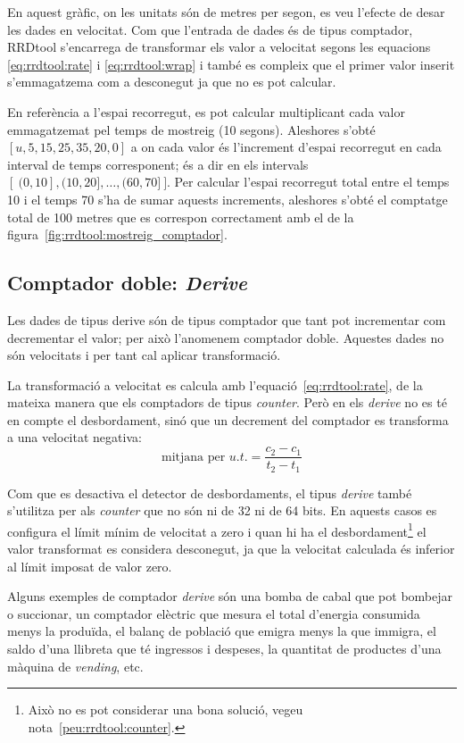 En aquest gràfic, on les unitats són de metres per segon, es veu l'efecte de desar les dades en velocitat. Com que l'entrada de dades és de tipus comptador, RRDtool s'encarrega de transformar els valor a velocitat segons les equacions \ref{eq:rrdtool:rate} i \ref{eq:rrdtool:wrap} i també es compleix que el primer valor inserit s'emmagatzema com a desconegut ja que no es pot calcular. 

En referència a l'espai recorregut, es pot calcular multiplicant cada valor emmagatzemat pel temps de mostreig (10 segons). Aleshores s'obté 
$[u , 5 , 15 , 25 , 35 , 20 , 0]$
a on cada valor és l'increment d'espai recorregut en cada interval de temps corresponent; és a dir en els intervals
$[\ (0,10], (10,20], \ldots, (60,70]\ ]$.
 Per calcular l'espai recorregut total entre el temps 10 i el temps 70 s'ha de sumar aquests increments, aleshores s'obté el comptatge total de 100 metres que es correspon correctament amb el de la figura~\ref{fig:rrdtool:mostreig_comptador}.





\subsection{Comptador doble:  \emph{Derive}}

Les dades de tipus derive són de tipus comptador que tant pot incrementar com decrementar el valor; per això l'anomenem comptador doble. Aquestes dades no són velocitats i per tant cal aplicar transformació. 

La transformació a velocitat es calcula amb l'equació~\ref{eq:rrdtool:rate}, de la mateixa manera que els comptadors de tipus \emph{counter}. Però en els \emph{derive} no es té en compte el desbordament, sinó que un decrement del comptador es transforma a una velocitat negativa:  
$$
\text{mitjana per }u.t. =\frac{c_2-c_1}{t_2-t_1}
$$

Com que es desactiva el detector de desbordaments, el tipus \emph{derive} també s'utilitza per als \emph{counter} que no són ni de 32 ni de 64 bits. En aquests casos es configura el límit mínim de velocitat a zero i quan hi ha el desbordament\footnote{Això no es pot considerar una bona solució, vegeu nota~\ref{peu:rrdtool:counter}.} el valor transformat es considera desconegut, ja que la velocitat calculada és inferior al límit imposat de valor zero. 

Alguns exemples de comptador \emph{derive} són una bomba de cabal que pot bombejar o succionar, un comptador elèctric que mesura el total d'energia consumida menys la produïda, el balanç de població que emigra menys la que immigra, el saldo d'una llibreta que té ingressos i despeses, la quantitat de productes d'una màquina de \emph{vending}, etc. 


